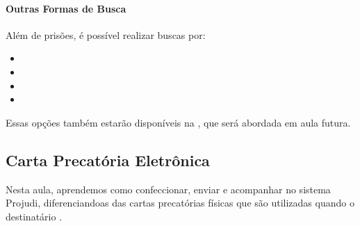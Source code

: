 \documentclass[letterpaper,10pt,brazil]{sphinxmanual}
\begin{document}
\paragraph{Outras Formas de Busca}
\label{\detokenize{projud_43_buscarelacaoreupreso:outras-formas-de-busca}}
\sphinxAtStartPar
Além de prisões, é possível realizar buscas por:
\begin{itemize}
\item {} 
\sphinxAtStartPar
{}

\item {} 
\sphinxAtStartPar
{}

\item {} 
\sphinxAtStartPar
{}

\item {} 
\sphinxAtStartPar
{}

\end{itemize}

\sphinxAtStartPar
Essas opções também estarão disponíveis na , que será abordada em aula futura.

\sphinxstepscope


\subsection{Carta Precatória Eletrônica}
\label{\detokenize{projud_44_cartaprecatoriaeletronica:carta-precatoria-eletronica}}\label{\detokenize{projud_44_cartaprecatoriaeletronica::doc}}
\sphinxAtStartPar
Nesta aula, aprendemos como confeccionar, enviar e acompanhar  no sistema Projudi, diferenciando\sphinxhyphen{}as das cartas precatórias físicas que são utilizadas quando o destinatário .
\end{document}
